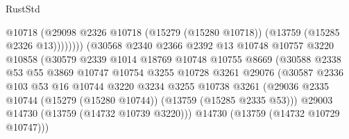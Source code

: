 \begin{lexlean}{RustStd}
\begin{coremodule}
                                            @10718
                                            (@29098
                                              @2326
                                              @10718
                                              (@15279 (@15280 @10718))
                                              (@13759 (@15285 @2326 @13))))))))
                                  (@30568
                                    @2340
                                    @2366
                                    @2392
                                    @13
                                    @10748
                                    @10757
                                    @3220
                                    @10858
                                    (@30579
                                      @2339
                                      @1014
                                      @18769
                                      @10748
                                      @10755
                                      @8669
                                      (@30588
                                        @2338
                                        @53
                                        @55
                                        @3869
                                        @10747
                                        @10754
                                        @3255
                                        @10728
                                        @3261
                                        @29076
                                        (@30587
                                          @2336
                                          @103
                                          @53
                                          @16
                                          @10744
                                          @3220
                                          @3234
                                          @3255
                                          @10738
                                          @3261
                                          (@29036
                                            @2335
                                            @10744
                                            (@15279 (@15280 @10744))
                                            (@13759 (@15285 @2335 @53)))
                                          @29003
                                          @14730
                                          (@13759 (@14732 @10739 @3220)))
                                        @14730
                                        (@13759 (@14732 @10729 @10747)))

\end{coremodule}
\end{lexlean}
